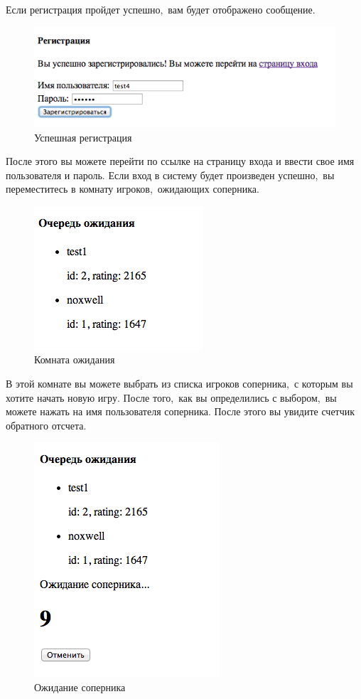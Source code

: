 \documentclass[14pt,a4paper]{report}
\begin{document}
Если регистрация пройдет успешно,~вам будет отображено сообщение.
\begin{figure}[H]
\centerline{\includegraphics[scale=0.5]{gfx/7_register_succ.png}}
\caption{Успешная регистрация}
\label{fig:register_succ}
\end{figure}
После этого вы можете перейти по ссылке на страницу входа и ввести свое имя пользователя и пароль. Если вход в систему будет произведен успешно,~вы переместитесь в комнату игроков,~ожидающих соперника.
\begin{figure}[H]
\centerline{\includegraphics[scale=0.5]{gfx/8_queue.png}}
\caption{Комната ожидания}
\label{fig:queue}
\end{figure}
В этой комнате вы можете выбрать из списка игроков соперника,~с которым вы хотите начать новую игру. После того,~как вы определились с выбором,~вы можете нажать на имя пользователя соперника. После этого вы увидите счетчик обратного отсчета.
\begin{figure}[H]
\centerline{\includegraphics[scale=0.5]{gfx/9_queue_request.png}}
\caption{Ожидание соперника}
\label{fig:queue_request}
\end{figure}
\end{document}
